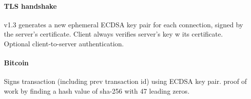 \documentclass[11pt]{article}
\begin{document}
\paragraph{TLS handshake} v1.3 generates a new ephemeral ECDSA key pair for each connection, signed by the server's certificate. Client always verifies server's key w its certificate. Optional client-to-server authentication.

\paragraph{Bitcoin} Signs transaction (including prev transaction id) using ECDSA key pair. proof of work by finding a hash value of sha-256 with 47 leading zeros.
\end{document}
